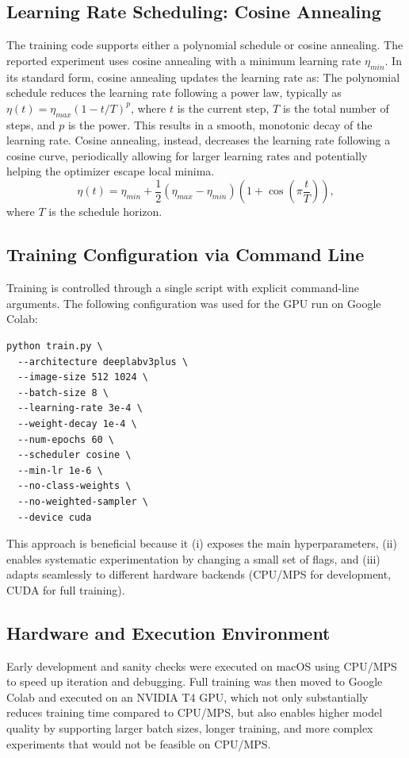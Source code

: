 \documentclass[conference]{IEEEtran}
\begin{document}
\subsection{Learning Rate Scheduling: Cosine Annealing}
The training code supports either a polynomial schedule or cosine annealing. The reported experiment uses cosine annealing with a minimum learning rate $\eta_{min}$. In its standard form, cosine annealing updates the learning rate as:
The polynomial schedule reduces the learning rate following a power law, typically as $\eta(t) = \eta_{max} (1 - t/T)^{p}$, where $t$ is the current step, $T$ is the total number of steps, and $p$ is the power. This results in a smooth, monotonic decay of the learning rate. Cosine annealing, instead, decreases the learning rate following a cosine curve, periodically allowing for larger learning rates and potentially helping the optimizer escape local minima.
\begin{equation}
\eta(t) = \eta_{min} + \frac{1}{2}(\eta_{max}-\eta_{min})\left(1+\cos\left(\pi \frac{t}{T}\right)\right),
\end{equation}
where $T$ is the schedule horizon.

\subsection{Training Configuration via Command Line}
Training is controlled through a single script with explicit command-line arguments. The following configuration was used for the GPU run on Google Colab:
\begin{lstlisting}
python train.py \
  --architecture deeplabv3plus \
  --image-size 512 1024 \
  --batch-size 8 \
  --learning-rate 3e-4 \
  --weight-decay 1e-4 \
  --num-epochs 60 \
  --scheduler cosine \
  --min-lr 1e-6 \
  --no-class-weights \
  --no-weighted-sampler \
  --device cuda
\end{lstlisting}
This approach is beneficial because it (i) exposes the main hyperparameters, (ii) enables systematic experimentation by changing a small set of flags, and (iii) adapts seamlessly to different hardware backends (CPU/MPS for development, CUDA for full training).

\subsection{Hardware and Execution Environment}
Early development and sanity checks were executed on macOS using CPU/MPS to speed up iteration and debugging. Full training was then moved to Google Colab and executed on an NVIDIA T4 GPU, which not only substantially reduces training time compared to CPU/MPS, but also enables higher model quality by supporting larger batch sizes, longer training, and more complex experiments that would not be feasible on CPU/MPS.
\end{document}
